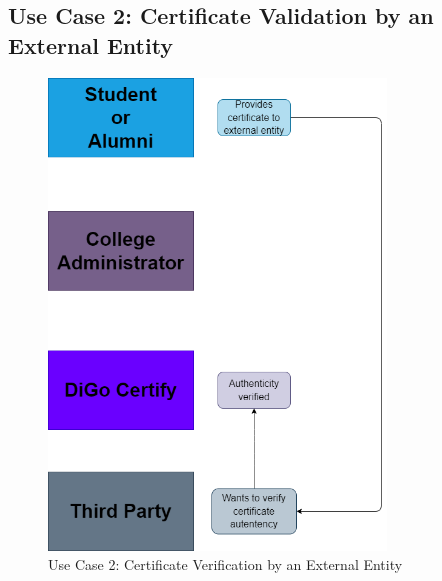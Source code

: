\subsection{Use Case 2: Certificate Validation by an External Entity}

\begin{figure}[H]
    \centering
    \includegraphics[width=0.8\textwidth]{../diagrams/certificate-validation.drawio.png}
    \caption{Use Case 2: Certificate Verification by an External Entity}
    \label{fig:use-case-2}
\end{figure}

